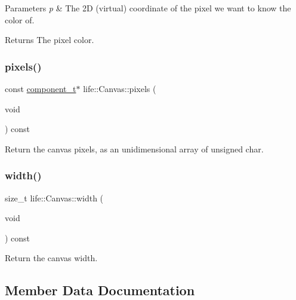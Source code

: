 \begin{DoxyParams}{Parameters}
{\em p} & The 2D (virtual) coordinate of the pixel we want to know the color of. \\
\hline
\end{DoxyParams}
\begin{DoxyReturn}{Returns}
The pixel color. 
\end{DoxyReturn}
\mbox{\label{classlife_1_1_canvas_a5078b777fd88aeba6c21e456e945ffaf}} 
\subsubsection{\texorpdfstring{pixels()}{pixels()}}
{\footnotesize\ttfamily const \mbox{\hyperlink{classlife_1_1_canvas_aa0de8894cefde751c08728d25e75a911}{component\+\_\+t}}$\ast$ life\+::\+Canvas\+::pixels (\begin{DoxyParamCaption}\item[{void}]{ }\end{DoxyParamCaption}) const\hspace{0.3cm}{\ttfamily [inline]}}



Return the canvas pixels, as an unidimensional array of {\ttfamily unsigned char}. 

\mbox{\label{classlife_1_1_canvas_ad968f24eb984369bdcdcb2cd794f9dd4}} 
\subsubsection{\texorpdfstring{width()}{width()}}
{\footnotesize\ttfamily size\+\_\+t life\+::\+Canvas\+::width (\begin{DoxyParamCaption}\item[{void}]{ }\end{DoxyParamCaption}) const\hspace{0.3cm}{\ttfamily [inline]}}



Return the canvas width. 



\subsection{Member Data Documentation}
\mbox{\label{classlife_1_1_canvas_a91085de7195ca7c7a016442491dd972a}} 
